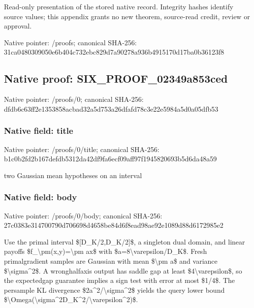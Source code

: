 \documentclass[10pt,a4paper]{article}
\begin{document}
Read-only presentation of the stored native record. Integrity hashes identify source values; this appendix grants no new theorem, source-read credit, review or approval.



Native pointer: /proofs; canonical SHA-256: 31ca0480309050e6b404c732\allowbreak{}ebc829d7a90278a936b49151\allowbreak{}70d17ba0b36123f8



\subsection{Native proof: SIX\_PROOF\_02349a853ced}


Native pointer: /proofs/0; canonical SHA-256: dfdb6c63ff2e1353858acbad\allowbreak{}32a5d753a26dfafd78c3e22e\allowbreak{}5984a5d0a05dfb53



\subsubsection{Native field: title}


Native pointer: /proofs/0/title; canonical SHA-256: b1c0b2fd2b167defdb5312da\allowbreak{}42df9fa6ecf09aff97f19458\allowbreak{}20693b5d6da48a59


two Gaussian mean hypotheses on an interval


\subsubsection{Native field: body}


Native pointer: /proofs/0/body; canonical SHA-256: 27c0383e314700790d706698\allowbreak{}d4658be84d6f8ead98ae92e1\allowbreak{}089d88d6172985e2


Use the primal interval \$[D\_K/2,D\_K/2]\$, a singleton dual domain, and linear payoffs \$f\_\textbackslash{}pm(x,y)=\textbackslash{}pm ax\$ with \$a=8\textbackslash{}varepsilon/D\_K\$. Fresh primalgradient samples are Gaussian with mean \$\textbackslash{}pm a\$ and variance \$\textbackslash{}sigma\textasciicircum{}2\$. A wronghalfaxis output has saddle gap at least \$4\textbackslash{}varepsilon\$, so the expectedgap guarantee implies a sign test with error at most \$1/4\$. The persample KL divergence \$2a\textasciicircum{}2/\textbackslash{}sigma\textasciicircum{}2\$ yields the query lower bound \$\textbackslash{}Omega(\textbackslash{}sigma\textasciicircum{}2D\_K\textasciicircum{}2/\textbackslash{}varepsilon\textasciicircum{}2)\$.
\end{document}
